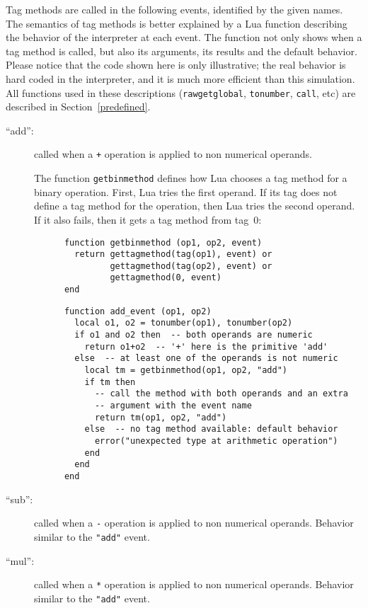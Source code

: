 \documentclass[11pt]{article}
\newcommand{\See}[1]{Section~\ref{#1}}
\begin{document}
Tag methods are called in the following events,
identified by the given names.
The semantics of tag methods is better explained by a Lua function
describing the behavior of the interpreter at each event.
The function not only shows when a tag method is called,
but also its arguments, its results and the default behavior.
Please notice that the code shown here is only illustrative;
the real behavior is hard coded in the interpreter,
and it is much more efficient than this simulation.
All functions used in these descriptions
(\verb|rawgetglobal|, \verb|tonumber|, \verb|call|, etc)
are described in \See{predefined}.

\begin{description}

\item[``add'':]
called when a \verb|+| operation is applied to non numerical operands.

The function \verb|getbinmethod| defines how Lua chooses a tag method
for a binary operation.
First, Lua tries the first operand.
If its tag does not define a tag method for the operation,
then Lua tries the second operand.
If it also fails, then it gets a tag method from tag~0:
\begin{verbatim}
      function getbinmethod (op1, op2, event)
        return gettagmethod(tag(op1), event) or
               gettagmethod(tag(op2), event) or
               gettagmethod(0, event)
      end
\end{verbatim}
\begin{verbatim}
      function add_event (op1, op2)
        local o1, o2 = tonumber(op1), tonumber(op2)
        if o1 and o2 then  -- both operands are numeric
          return o1+o2  -- '+' here is the primitive 'add'
        else  -- at least one of the operands is not numeric
          local tm = getbinmethod(op1, op2, "add")
          if tm then
            -- call the method with both operands and an extra
            -- argument with the event name
            return tm(op1, op2, "add")
          else  -- no tag method available: default behavior
            error("unexpected type at arithmetic operation")
          end
        end
      end
\end{verbatim}

\item[``sub'':]
called when a \verb|-| operation is applied to non numerical operands.
Behavior similar to the \verb|"add"| event.

\item[``mul'':]
called when a \verb|*| operation is applied to non numerical operands.
Behavior similar to the \verb|"add"| event.


\end{description}
\end{document}
